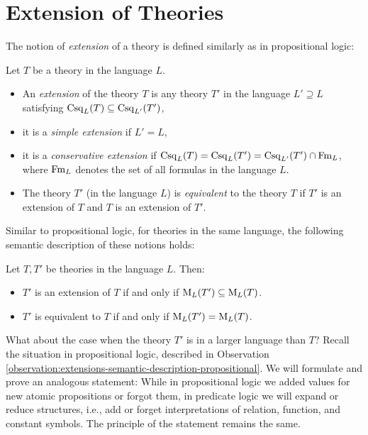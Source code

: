 \section{Extension of Theories}

The notion of \emph{extension} of a theory is defined similarly as in propositional logic:

\begin{definition}
    Let $T$ be a theory in the language $L$.
    \begin{itemize}
        \item An \emph{extension} of the theory $T$ is any theory $T'$ in the language $L'\supseteq L$ satisfying $\operatorname{Csq}_L(T)\subseteq\operatorname{Csq}_{L'}(T')$,
        \item it is a \emph{simple extension} if $L'=L$,
        \item it is a \emph{conservative extension} if $\operatorname{Csq}_L(T)=\operatorname{Csq}_L(T')=\operatorname{Csq}_{L'}(T')\cap \operatorname{Fm}_L$, where $\operatorname{Fm}_L$ denotes the set of all formulas in the language $L$.
        \item The theory $T'$ (in the language $L$) is \emph{equivalent} to the theory $T$ if $T'$ is an extension of $T$ and $T$ is an extension of $T'$.
    \end{itemize}
\end{definition}

Similar to propositional logic, for theories in the same language, the following semantic description of these notions holds:

\begin{observation}
Let $T,T'$ be theories in the language $L$. Then:
\begin{itemize}
    \item $T'$ is an extension of $T$ if and only if $\operatorname{M}_L(T')\subseteq\operatorname{M}_L(T)$.
    \item $T'$ is equivalent to $T$ if and only if $\operatorname{M}_L(T')=\operatorname{M}_L(T)$.
\end{itemize}
\end{observation}

What about the case when the theory $T'$ is in a larger language than $T$? Recall the situation in propositional logic, described in Observation \ref{observation:extensions-semantic-description-propositional}. We will formulate and prove an analogous statement: While in propositional logic we added values for new atomic propositions or forgot them, in predicate logic we will expand or reduce structures, i.e., add or forget interpretations of relation, function, and constant symbols. The principle of the statement remains the same.

